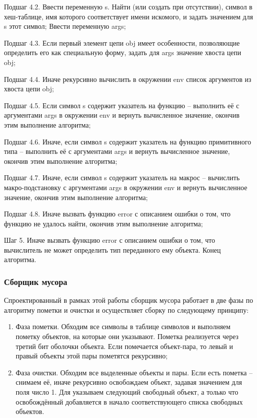 Подшаг 4.2. Ввести переменную s. Найти (или создать при отсутствии), символ в хеш-таблице, имя которого соответствует имени искомого, и задать значением для s этот символ; Ввести переменную args;

Подшаг 4.3. Если первый элемент цепи obj имеет особенности, позволяющие определить его как специальную форму, задать для args значение хвоста цепи obj;

Подшаг 4.4. Иначе рекурсивно вычислить в окружении env список аргументов из хвоста цепи obj;

Подшаг 4.5. Если символ s содержит указатель на функцию -- выполнить её с аргументами args в окружении env и вернуть вычисленное значение, окончив этим выполнение алгоритма;

Подшаг 4.6. Иначе, если символ s содержит указатель на функцию примитивного типа -- выполнить её с аргументами args и вернуть вычисленное значение, окончив этим выполнение алгоритма;

Подшаг 4.7. Иначе, если символ s содержит указатель на макрос -- вычислить макро-подстановку с аргументами args в окружении env и вернуть вычисленное значение, окончив этим выполнение алгоритма;

Подшаг 4.8. Иначе вызвать функцию error с описанием ошибки о том, что функцию не удалось найти, окончив этим выполнение алгоритма;

Шаг 5. Иначе вызвать функцию error с описанием ошибки о том, что вычислитель не может определить тип переданного ему объекта. Конец алгоритма.

\subsubsection{Сборщик мусора}
Спроектированный в рамках этой работы сборщик мусора работает в две фазы по алгоритму пометки и очистки и осуществляет сборку по следующему принципу:

\begin{enumerate}
	\item Фаза пометки.
	Обходим все символы в таблице символов и выполняем пометку объектов, на которые они указывают. Пометка реализуется через третий бит оболочки объекта. Если помечается объект-пара, то левый и правый объекты этой пары пометятся рекурсивно;
	
	\item Фаза очистки.
	Обходим все выделенные объекты и пары. Если есть пометка -- снимаем её, иначе рекурсивно освобождаем объект, задавая значением для поля  число 1. Для  указываем следующий свободный объект, а только что освобождённый добавляется в начало соответствующего списка свободных объектов.
	
\end{enumerate}

